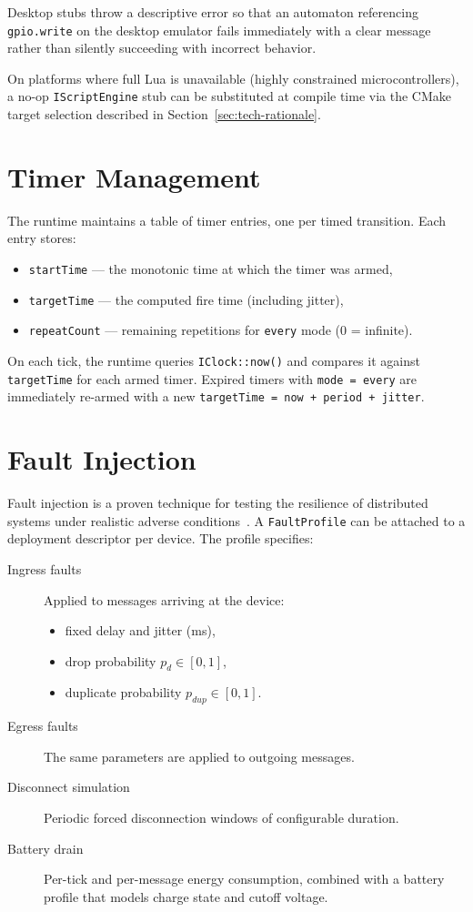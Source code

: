 \noindent Desktop stubs throw a descriptive error so that an automaton referencing \texttt{gpio.write} on the desktop emulator fails immediately with a clear message rather than silently succeeding with incorrect behavior.

On platforms where full Lua is unavailable (highly constrained microcontrollers), a no-op \texttt{IScriptEngine} stub can be substituted at compile time via the CMake target selection described in Section~\ref{sec:tech-rationale}.

\section{Timer Management}

The runtime maintains a table of timer entries, one per timed transition. Each entry stores:
\begin{itemize}
  \item \texttt{startTime} --- the monotonic time at which the timer was armed,
  \item \texttt{targetTime} --- the computed fire time (including jitter),
  \item \texttt{repeatCount} --- remaining repetitions for \texttt{every} mode (0 = infinite).
\end{itemize}

On each tick, the runtime queries \texttt{IClock::now()} and compares it against \texttt{targetTime} for each armed timer. Expired timers with \texttt{mode = every} are immediately re-armed with a new \texttt{targetTime = now + period + jitter}.

\section{Fault Injection}
\label{sec:fault}

Fault injection is a proven technique for testing the resilience of distributed systems under realistic adverse conditions~\cite{Beilharz2022}. A \texttt{FaultProfile} can be attached to a deployment descriptor per device. The profile specifies:
\begin{description}
  \item[Ingress faults] Applied to messages arriving at the device:
    \begin{itemize}
      \item fixed delay and jitter (ms),
      \item drop probability $p_d \in [0, 1]$,
      \item duplicate probability $p_{dup} \in [0, 1]$.
    \end{itemize}
  \item[Egress faults] The same parameters are applied to outgoing messages.
  \item[Disconnect simulation] Periodic forced disconnection windows of configurable duration.
  \item[Battery drain] Per-tick and per-message energy consumption, combined with a battery profile that models charge state and cutoff voltage.
\end{description}

